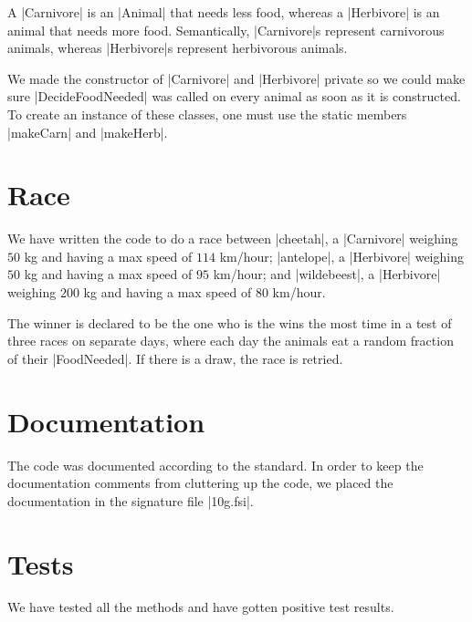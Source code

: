 \documentclass[a4paper]{article}
\begin{document}
A \code|Carnivore| is an \code|Animal| that needs less food, whereas a \code|Herbivore| is an animal that needs more food. Semantically, \code|Carnivore|s represent carnivorous animals, whereas \code|Herbivore|s represent herbivorous animals.

We made the constructor of \code|Carnivore| and \code|Herbivore| private so we could make sure \code|DecideFoodNeeded| was called on every animal as soon as it is constructed. To create an instance of these classes, one must use the static members \code|makeCarn| and \code|makeHerb|.

\section{Race}

We have written the code to do a race between \code|cheetah|, a \code|Carnivore| weighing \(50\) kg and having a max speed of \(114\) km/hour; \code|antelope|, a \code|Herbivore| weighing \(50\) kg and having a max speed of \(95\) km/hour; and \code|wildebeest|, a \code|Herbivore| weighing \(200\) kg  and having a max speed of \(80\) km/hour.

The winner is declared to be the one who is the wins the most time in a test of three races on separate days, where each day the animals eat a random fraction of their \code|FoodNeeded|. If there is a draw, the race is retried.

\section{Documentation}

The code was documented according to the standard. In order to keep the documentation comments from cluttering up the code, we placed the documentation in the signature file \code|10g.fsi|.

\section{Tests}

We have tested all the methods and have gotten positive test results.
\end{document}
